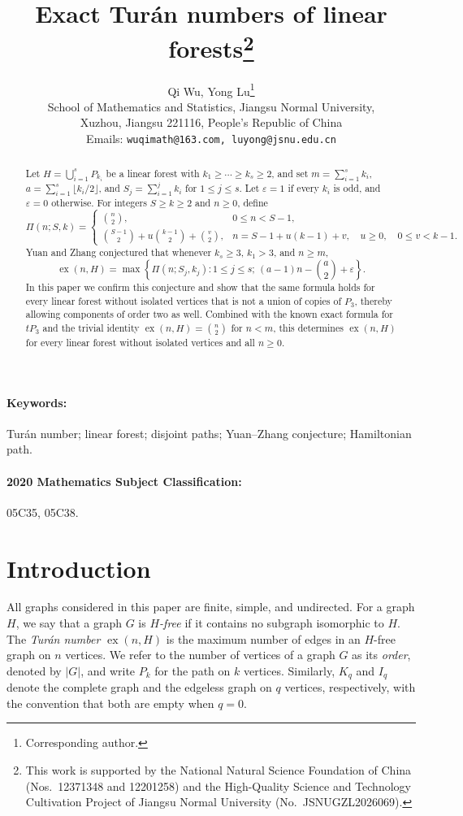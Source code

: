 \documentclass[10pt]{article}
\title{Exact Tur\'an numbers of linear forests\thanks{This work is supported by the National Natural Science Foundation of China (Nos.\ 12371348 and 12201258) and the High-Quality Science and Technology Cultivation Project of Jiangsu Normal University (No.\ JSNUGZL2026069).}}
\author{Qi Wu, Yong Lu\thanks{Corresponding author.}\\
School of Mathematics and Statistics, Jiangsu Normal University,\\
Xuzhou, Jiangsu 221116, People's Republic of China\\
Emails: \texttt{wuqimath@163.com, luyong@jsnu.edu.cn}}
\date{}
\theoremstyle{compactplain}
\theoremstyle{remark}\newtheorem{remark}[theorem]{Remark}
\newcommand{\ex}{\operatorname{ex}}
\begin{document}
\maketitle

\begin{abstract}
Let $H=\bigcup_{i=1}^s P_{k_i}$ be a linear forest with
$k_1\ge\cdots\ge k_s\ge2$, and set $m=\sum_{i=1}^s k_i$,
$a=\sum_{i=1}^s\lfloor k_i/2\rfloor$, and $S_j=\sum_{i=1}^j k_i$ for
$1\le j\le s$. Let $\varepsilon=1$ if every $k_i$ is odd, and
$\varepsilon=0$ otherwise. For integers $S\ge k\ge2$ and $n\ge0$, define
\[
 \Pi(n;S,k)=
 \begin{cases}
  \binom{n}{2}, & 0\le n<S-1,\\[2pt]
  \displaystyle\binom{S-1}{2}+u\binom{k-1}{2}+\binom{v}{2},
   & n=S-1+u(k-1)+v,\quad u\ge0,\quad 0\le v<k-1.
 \end{cases}
\]
Yuan and Zhang conjectured that whenever $k_s\ge3$, $k_1>3$, and
$n\ge m$,
\[
 \ex(n,H)=\max\left\{\Pi(n;S_j,k_j):1\le j\le s;\,
 (a-1)n-\binom{a}{2}+\varepsilon\right\}.
\]
In this paper we confirm this conjecture and show that the same formula
holds for every linear forest without isolated vertices that is not a
union of copies of $P_3$, thereby allowing components of order two as
well. Combined with the known exact formula for $tP_3$ and the trivial
identity $\ex(n,H)=\binom{n}{2}$ for $n<m$, this determines $\ex(n,H)$
for every linear forest without isolated vertices and all $n\ge0$.
\end{abstract}

\paragraph{Keywords:} Tur\'an number; linear forest; disjoint paths;
Yuan--Zhang conjecture; Hamiltonian path.

\paragraph{2020 Mathematics Subject Classification:} 05C35, 05C38.

\section{Introduction}\label{sec:intro}

All graphs considered in this paper are finite, simple, and undirected.
For a graph $H$, we say that a graph $G$ is \emph{$H$-free} if it
contains no subgraph isomorphic to $H$. The \emph{Tur\'an number}
$\ex(n,H)$ is the maximum number of edges in an $H$-free graph on $n$
vertices. We refer to the number of vertices of a graph $G$ as its
\emph{order}, denoted by $|G|$, and write $P_k$ for the path on $k$
vertices. Similarly, $K_q$ and $I_q$ denote the complete graph and the
edgeless graph on $q$ vertices, respectively, with the convention that
both are empty when $q=0$.
\end{document}
